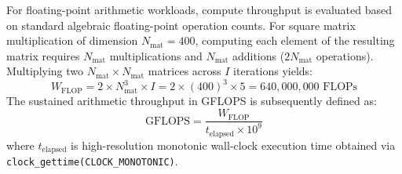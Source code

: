 For floating-point arithmetic workloads, compute throughput is evaluated based on standard algebraic floating-point operation counts. For square matrix multiplication of dimension $N_{\text{mat}} = 400$, computing each element of the resulting matrix requires $N_{\text{mat}}$ multiplications and $N_{\text{mat}}$ additions ($2 N_{\text{mat}}$ operations). Multiplying two $N_{\text{mat}} \times N_{\text{mat}}$ matrices across $I$ iterations yields:
\begin{equation}
    W_{\text{FLOP}} = 2 \times N_{\text{mat}}^3 \times I = 2 \times (400)^3 \times 5 = 640,000,000 \text{ FLOPs}
    \label{eq:flop_formula}
\end{equation}
The sustained arithmetic throughput in GFLOPS is subsequently defined as:
\begin{equation}
    \text{GFLOPS} = \frac{W_{\text{FLOP}}}{t_{\text{elapsed}} \times 10^9}
\end{equation}
where $t_{\text{elapsed}}$ is high-resolution monotonic wall-clock execution time obtained via \texttt{clock\_gettime(CLOCK\_MONOTONIC)}.
